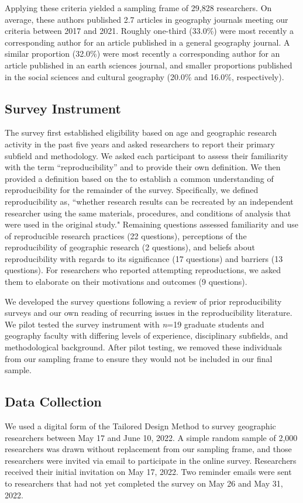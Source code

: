 \documentclass[]{interact}
\newcommand{\citep}{\parencite}
\theoremstyle{plain}%
\theoremstyle{definition}
\theoremstyle{remark}
\begin{document}
Applying these criteria yielded a sampling frame of 29,828 researchers. 
On average, these authors published 2.7 articles in geography journals meeting our criteria between 2017 and 2021. 
Roughly one-third (33.0\%) were most recently a corresponding author for an article published in a general geography journal. 
A similar proportion (32.0\%) were most recently a corresponding author for an article published in an earth sciences journal, and smaller proportions published in the social sciences and cultural geography (20.0\% and 16.0\%, respectively).

\subsection*{Survey Instrument}
The survey first established eligibility based on age and geographic research activity in the past five years and asked researchers to report their primary subfield and methodology.
We asked each participant to assess their familiarity with the term ``reproducibility'' and to provide their own definition. 
We then provided a definition based on the \textcite{NASEM2019} to establish a common understanding of reproducibility for the remainder of the survey.
Specifically, we defined reproducibility as, ``whether research results can be recreated by an independent researcher using the same materials, procedures, and conditions of analysis that were used in the original study."
Remaining questions assessed familiarity and use of reproducible research practices (22 questions), perceptions of the reproducibility of geographic research (2 questions), and beliefs about reproducibility with regards to its significance (17 questions) and barriers (13 questions).
For researchers who reported attempting reproductions, we asked them to elaborate on their motivations and outcomes (9 questions).

We developed the survey questions following a review of prior reproducibility surveys \citep[e.g.,][]{fanelli2009many,baker20161, konkol2019} and our own reading of recurring issues in the reproducibility literature. 
We pilot tested the survey instrument with \textit{n}=19 graduate students and geography faculty with differing levels of experience, disciplinary subfields, and methodological background. 
After pilot testing, we removed these individuals from our sampling frame to ensure they would not be included in our final sample.

\subsection*{Data Collection}
We used a digital form of the Tailored Design Method \citep{dillman2014internet} to survey geographic researchers between May 17 and June 10, 2022.
A simple random sample of 2,000 researchers was drawn without replacement from our sampling frame, and those researchers were invited via email to participate in the online survey. 
Researchers received their initial invitation on May 17, 2022. 
Two reminder emails were sent to researchers that had not yet completed the survey on May 26 and May 31, 2022.
\end{document}
